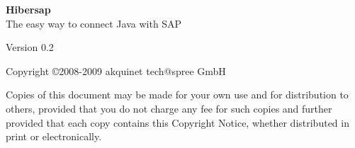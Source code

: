 \begin{titlepage}
	 \HRule 
	\begin{flushleft} 
		\Huge {\bf Hibersap} \\
		\LARGE The easy way to connect Java with SAP \\
	\end{flushleft}
	\HRule {} 
	\begin{center} 
		\large Version 0.2 
	\end{center}
	\begin{center}
		\large Copyright \copyright 2008-2009 akquinet tech@spree GmbH 
	\end{center}
	\begin{center} 
		Copies of this document may be made for your own use and for distribution to others, 
		provided that you do not charge any fee for such copies and further provided that each 
		copy contains this Copyright Notice, whether distributed in print or
		electronically.
	\end{center}
\end{titlepage}
